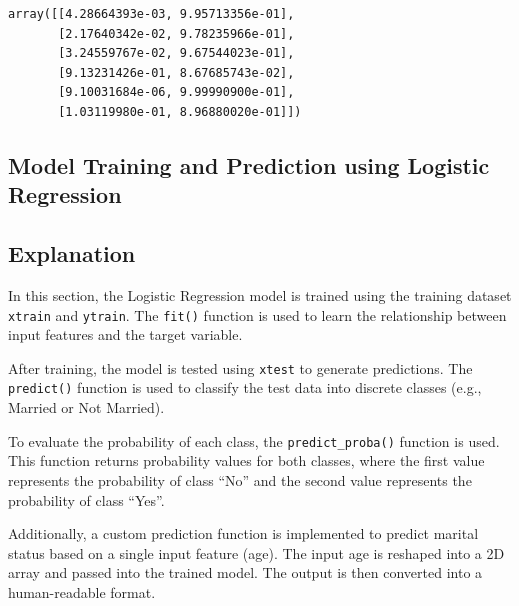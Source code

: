 \documentclass[11pt]{article}
\makeatletter
\newcommand{\boxspacing}{\kern\kvtcb@left@rule\kern\kvtcb@boxsep}
\newcommand{\prompt}[4]{
        {\ttfamily\llap{{\color{#2}[#3]:\hspace{3pt}#4}}\vspace{-\baselineskip}}
    }
\makeatother
\begin{document}
            \begin{tcolorbox}[breakable, size=fbox, boxrule=.5pt, pad at break*=1mm, opacityfill=0]
\prompt{Out}{outcolor}{28}{\boxspacing}
\begin{Verbatim}[commandchars=\\\{\}]
array([[4.28664393e-03, 9.95713356e-01],
       [2.17640342e-02, 9.78235966e-01],
       [3.24559767e-02, 9.67544023e-01],
       [9.13231426e-01, 8.67685743e-02],
       [9.10031684e-06, 9.99990900e-01],
       [1.03119980e-01, 8.96880020e-01]])
\end{Verbatim}
\end{tcolorbox}


\subsection{Model Training and Prediction using Logistic Regression}
\subsection*{Explanation}

In this section, the Logistic Regression model is trained using the training dataset \texttt{xtrain} and \texttt{ytrain}. The \texttt{fit()} function is used to learn the relationship between input features and the target variable.

After training, the model is tested using \texttt{xtest} to generate predictions. The \texttt{predict()} function is used to classify the test data into discrete classes (e.g., Married or Not Married).

To evaluate the probability of each class, the \texttt{predict\_proba()} function is used. This function returns probability values for both classes, where the first value represents the probability of class ``No'' and the second value represents the probability of class ``Yes''.

Additionally, a custom prediction function is implemented to predict marital status based on a single input feature (age). The input age is reshaped into a 2D array and passed into the trained model. The output is then converted into a human-readable format.
\end{document}
